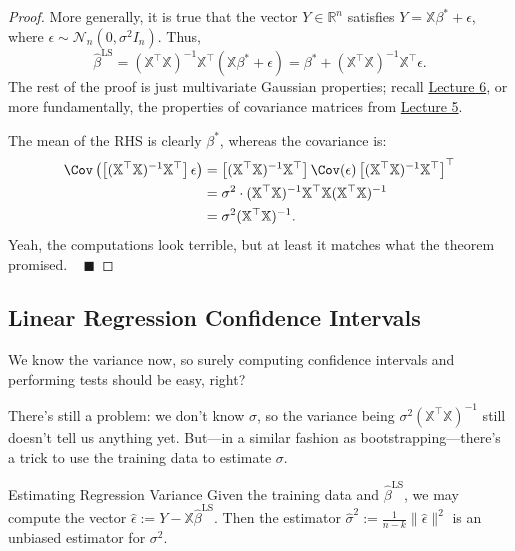 \begin{proof}
    More generally, it is true that the vector $Y \in \mathbb{R}^n$
    satisfies $Y = \mathbb{X}\beta^* + \epsilon$,
    where $\epsilon \sim \mathcal{N}_n(0, \sigma^2 I_n)$.  Thus,
    \[ \hat{\beta}^{\mathrm{LS}}
    = (\mathbb{X}^{\top}\mathbb{X})^{-1}\mathbb{X}^{\top}(
        \mathbb{X}\beta^* + \epsilon
    )
    = \beta^* + (\mathbb{X}^{\top}\mathbb{X})^{-1}\mathbb{X}^{\top}\epsilon. \]
    The rest of the proof is just multivariate Gaussian properties; recall
    \href{/18.650/lectures/6/#multivariate-gaussian-properties-and-theorems}{Lecture 6},
    or more fundamentally, the properties of
    covariance matrices from \href{/18.650/lectures/5/}{Lecture 5}.

    The mean of the RHS is clearly $\beta^*$,
    whereas the covariance is:
    \begin{align*}
    \Cov\left(
        \left[(\mathbb{X}^{\top}\mathbb{X})^{-1}\mathbb{X}^{\top}\right]
    \epsilon \right)
    & = \left[(\mathbb{X}^{\top}\mathbb{X})^{-1}\mathbb{X}^{\top}\right]
    \Cov(\epsilon)
    \left[(\mathbb{X}^{\top}\mathbb{X})^{-1}\mathbb{X}^{\top}\right]^{\top} \\
    & = \sigma^2 \cdot
    (\mathbb{X}^{\top}\mathbb{X})^{-1}\mathbb{X}^{\top}
    \mathbb{X}(\mathbb{X}^{\top}\mathbb{X})^{-1} \\
    & = \sigma^2 (\mathbb{X}^{\top}\mathbb{X})^{-1}.
    \end{align*}
    Yeah, the computations look terrible,
    but at least it matches what the theorem promised. ~ $\blacksquare$
\end{proof}

\subsection{Linear Regression Confidence Intervals}

We know the variance now,
so surely computing confidence intervals and performing tests
should be easy, right?

There's still a problem: we don't know $\sigma$,
so the variance being $\sigma^2(\mathbb{X}^{\top}\mathbb{X})^{-1}$
still doesn't tell us anything yet.
But---in a similar fashion as bootstrapping---there's a trick
to use the training data to estimate $\sigma$.

\begin{theorem}{Estimating Regression Variance}
    Given the training data and $\hat{\beta}^{\mathrm{LS}}$,
    we may compute the vector
    $\hat{\epsilon} := Y - \mathbb{X}\hat{\beta}^{\mathrm{LS}}$.
    Then the estimator $\hat{\sigma}^2 := \frac{1}{n - k} \|\hat{\epsilon}\|^2$
    is an unbiased estimator for $\sigma^2$.
\end{theorem}

